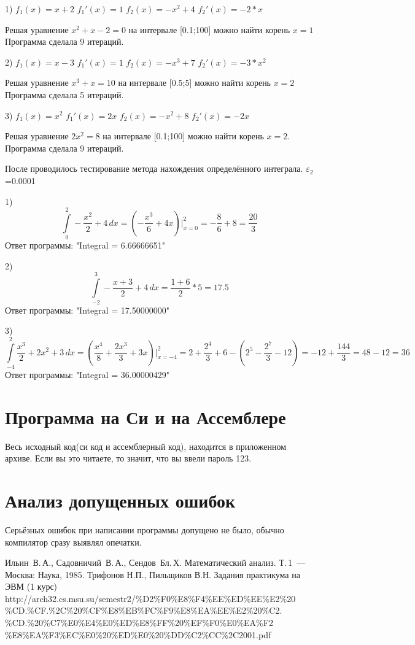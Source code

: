 \documentclass[a4paper,12pt,titlepage,finall]{article}
\begin{document}
1) $f_1(x)=x+2$ $f_1'(x)=1$  $f_2(x)=-x^2+4$ $f_2'(x)=-2*x$ 

Решая уравнение $x^2 + x - 2 = 0$ на интервале [0.1;100] можно найти корень $x=1$ Программа сделала 9 итераций.

2) $f_1(x)=x-3$ $f_1'(x)=1$  $f_2(x)=-x^3+7$ $f_2'(x)=-3*x^2$ 

Решая уравнение $x^3 + x = 10$ на интервале [0.5;5] можно найти корень $x=2$ Программа сделала 5 итераций.

3) $f_1(x)=x^2$ $f_1'(x)=2x$  $f_2(x)=-x^2+8$ $f_2'(x)=-2x$ 

Решая уравнение $2x^2 = 8$ на интервале [0.1;100] можно найти корень $x=2$. Программа сделала 9 итераций.



После проводилось тестирование метода нахождения определённого интеграла. $\varepsilon_2$=0.0001

1) $$\int\limits_{0}^{2} -\frac{x^2}{2}+4\,dx = (-\frac{x^3}{6}+4x)\bigg|_{x=0}^2 = -\frac{8}{6} + 8 = \frac{20}{3}$$
Ответ программы: "Integral = 6.66666651"  

2) $$\int\limits_{-2}^{3} -\frac{x+3}{2}+4\,dx = \frac{1+6}{2}*5 = 17.5$$
Ответ программы: "Integral = 17.50000000"  

3) $$\int\limits_{-4}^{2} \frac{x^3}{2}+2x^2+3\,dx = (\frac{x^4}{8}+\frac{2x^3}{3}+3x)\bigg|_{x=-4}^2 = 2 +\frac{2^4}{3} + 6 - (2^5 -\frac{2^7}{3} - 12) = -12 + \frac{144}{3} = 48 - 12 = 36$$
Ответ программы: "Integral = 36.00000429"  

\newpage

\section{Программа на Си и на Ассемблере}

Весь исходный код(си код и ассемблерный код), находится в приложенном архиве. Если вы это читаете, то значит, что вы ввели пароль 123.

\newpage

\section{Анализ допущенных ошибок}

Серьёзных ошибок при написании программы допущено не было, обычно компилятор сразу выявлял опечатки.

\newpage
\begin{raggedright}
\begin{thebibliography}{99}
 Ильин~В.\,А., Садовничий~В.\,А., Сендов~Бл.\,Х. Математический анализ. Т.\,1~---
    Москва: Наука, 1985.
 Трифонов Н.П., Пильщиков В.Н. Задания практикума на ЭВМ (1 курс)  http://arch32.cs.msu.su/semestr2/\%D2\%F0\%E8\%F4\%EE\%ED\%EE\%E2\%20
\%CD.\%CF.\%2C\%20\%CF\%E8\%EB\%FC\%F9\%E8\%EA\%EE\%E2\%20\%C2.
\%CD.\%20\%C7\%E0\%E4\%E0\%ED\%E8\%FF\%20\%EF\%F0\%E0\%EA\%F2
\%E8\%EA\%F3\%EC\%E0\%20\%ED\%E0\%20\%DD\%C2\%CC\%2C2001.pdf
\end{thebibliography}
\end{raggedright}

\newpage
\end{document}

